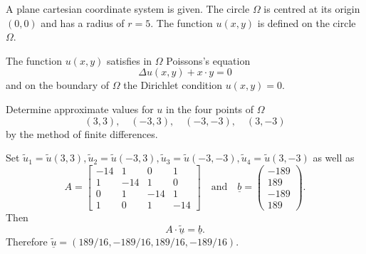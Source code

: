 A plane cartesian coordinate system is given.
The circle $\Omega$ is centred at its origin $(0,0)$ and has a radius of
$r = 5$.  
The function $u(x,y)$ is defined on the circle 
$\Omega$. 

\bigskip

The function $u(x,y)$ satisfies in $\Omega$ Poissons's equation
\[
\Delta u(x,y) + x \cdot y = 0
\]
and on the boundary of $\Omega$ the Dirichlet condition $u(x,y) = 0.$

\bigskip
Determine approximate values for $u$ in the four points of $\Omega$ 
\[
(3,3), \quad
(-3,3), \quad
(-3,-3), \quad
(3,-3)
\]
by the method of finite differences. 


\begin{loesung}
Set
$\tilde u_1 = \tilde u(3,3),
\tilde u_2 = \tilde u(-3,3),
\tilde u_3 = \tilde u(-3,-3),
\tilde u_4 = \tilde u(3,-3)$
as well as
\[
A
=
\left[
\begin{array}{rrrr}
-14 & 1 & 0 & 1 \\
1 & -14 & 1 & 0 \\
0 & 1 & -14 & 1 \\
1 & 0 & 1 & -14
\end{array}
\right]
\quad \text{and} \quad
\underline{b}
=
\left(
\begin{array}{r}
-189 \\
 189 \\
-189 \\
 189
\end{array}
\right).
\]
Then 
\[
A \cdot \underline{\tilde u} = \underline{b}.
\]
Therefore $\underline{\tilde u} = ( 189/16, -189/16, 189/16, -189/16)$.
\end{loesung}
